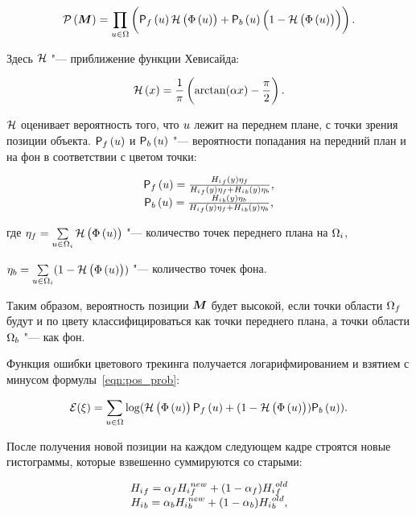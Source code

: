 \begin{equation}
\label{eqn:pos_prob}
    \mathcal{P} \left( \bm{M} \right)  = \prod\limits_{\mathnormal{u} \in \Omega} \left(
        \mathsf{P}_f \left( \mathnormal{u} \right) \mathcal{H} \left( \Phi \left( \mathnormal{u} \right) \right)
        + \mathsf{P}_b \left( \mathnormal{u} \right) \left( 1 - \mathcal{H} \left( \Phi \left( \mathnormal{u} \right) \right) \right)
    \right)
\text{.}
\end{equation}

Здесь $\mathcal{H}$ "--- приближение функции Хевисайда:

\begin{equation}
\label{eqn:heaviside}
    \mathcal{H} \left( x \right) = \frac{1}{\pi} \left( \arctan(\alpha x) - \frac{\pi}{2} \right)
\text{.}
\end{equation}

$\mathcal{H}$ оценивает вероятность того, что $\mathnormal{u}$ лежит на переднем плане, с точки
зрения позиции объекта.
$\mathsf{P}_f \left( \mathnormal{u} \right)$ и $\mathsf{P}_b \left( \mathnormal{u} \right)$ "--- вероятности попадания на передний план и 
на фон в соответствии с цветом точки:

\begin{equation}
\label{eqn:Pfu}
\begin{array}{c}
\mathsf{P}_f \left( \mathnormal{u} \right) = \frac{{H_i}_f(y)\eta_f}{{H_i}_f(y)\eta_f +
{H_i}_b(y)\eta_b} \text{,} \\
\mathsf{P}_b \left( \mathnormal{u} \right) =\frac{{H_i}_b(y)\eta_b}{{H_i}_f(y)\eta_f +
{H_i}_b(y)\eta_b} \text{,}
\end{array}
\end{equation}

где
$
    \eta_f = \sum\limits_{\mathnormal{u} \in \Omega_i}\mathcal{H} \left( \Phi \left( \mathnormal{u} \right) \right)
$ "--- количество точек переднего плана на $\Omega_i$,

$
    \eta_b = \sum\limits_{\mathnormal{u} \in \Omega_i}(1 - \mathcal{H} \left( \Phi \left( \mathnormal{u} \right) \right))
$ "--- количество точек фона.


Таким образом, вероятность позиции $\bm{M}$ будет высокой, если точки области
$\Omega_f$ будут и по цвету классифицироваться как точки переднего плана, а
точки области $\Omega_b$ "--- как фон.

Функция ошибки цветового трекинга получается логарифмированием и взятием с
минусом
формулы~\ref{eqn:pos_prob}:

\begin{equation}
\label{eqn:err_func}
\mathcal{E}(\xi) = \sum\limits_{\mathnormal{u} \in \Omega}
\log(\mathcal{H} \left( \Phi \left( \mathnormal{u} \right) \right) \mathsf{P}_f \left( \mathnormal{u} \right) + (1 - \mathcal{H} \left( \Phi \left( \mathnormal{u} \right) \right))\mathsf{P}_b \left( \mathnormal{u} \right))
\text{.}
\end{equation}

После получения новой позиции на каждом следующем кадре строятся новые
гистограммы, которые взвешенно суммируются со старыми: 

\begin{equation}
\begin{array}{c}
{\ensuremath{H_i}}_f = \alpha_f {H_i}_f^{new} + (1 - \alpha_f) {H_i}_f^{old} \\
{H_i}_b = \alpha_b {H_i}_b^{new} + (1 - \alpha_b) {H_i}_b^{old}
\text{,}
\end{array}
\end{equation}

